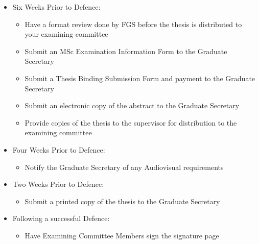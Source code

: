 \documentclass{article}
\begin{document}
\begin{itemize}
    \item Six Weeks Prior to Defence:

        \begin{itemize}

            \item Have a format review done by FGS before the thesis is
                distributed to your examining committee

            \item Submit an MSc Examination Information Form to the Graduate
                Secretary

            \item Submit a Thesis Binding Submission Form and payment to the
                Graduate Secretary

            \item Submit an electronic copy of the abstract to the Graduate
                Secretary

            \item Provide copies of the thesis to the supervisor for
                distribution to the examining committee

        \end{itemize}

    \item Four Weeks Prior to Defence:
        \begin{itemize}

            \item Notify the Graduate Secretary of any Audiovisual requirements

        \end{itemize}

    \item Two Weeks Prior to Defence:
        \begin{itemize}

            \item Submit a printed copy of the thesis to the Graduate Secretary

        \end{itemize}

    \item Following a successful Defence:

        \begin{itemize}

            \item Have Examining Committee Members sign the signature page


\end{itemize}
\end{itemize}
\end{document}
